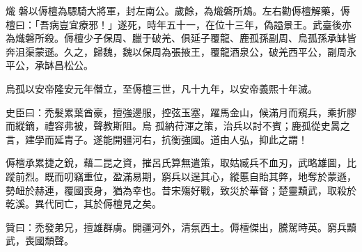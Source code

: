 \begin{pinyinscope}
 熾
 磐以傉檀為驃騎大將軍，封左南公。歲餘，為熾磐所鴆。左右勸傉檀解藥，傉檀曰：「吾病豈宜療邪！」遂死，時年五十一，在位十三年，偽謚景王。武臺後亦為熾磐所殺。傉檀少子保周、臘于破羌、俱延子覆龍、鹿孤孫副周、烏孤孫承缽皆奔沮渠蒙遜。久之，歸魏，魏以保周為張掖王，覆龍酒泉公，破羌西平公，副周永平公，承缽昌松公。



 烏孤以安帝隆安元年僭立，至傉檀三世，凡十九年，以安帝義熙十年滅。



 史臣曰：禿髮累葉酋豪，擅強邊服，控弦玉塞，躍馬金山，候滿月而窺兵，乘折膠而縱鏑，禮容弗被，聲教斯阻。烏
 孤納苻渾之策，治兵以討不賓；鹿孤從史暠之言，建學而延胄子。遂能開疆河右，抗衡強國。道由人弘，抑此之謂！



 傉檀承累捷之銳，藉二昆之資，摧呂氏算無遣策，取姑臧兵不血刃，武略雄圖，比蹤前烈。既而叨竊重位，盈滿易期，窮兵以逞其心，縱慝自貽其弊，地奪於蒙遜，勢衄於赫連，覆國喪身，猶為幸也。昔宋殤好戰，致災於華督；楚靈黷武，取殺於乾溪。異代同亡，其於傉檀見之矣。



 贊曰：禿發弟兄，擅雄群虜。開疆河外，清氛西土。傉檀傑出，騰駕時英。窮兵黷武，喪國頹聲。



\end{pinyinscope}